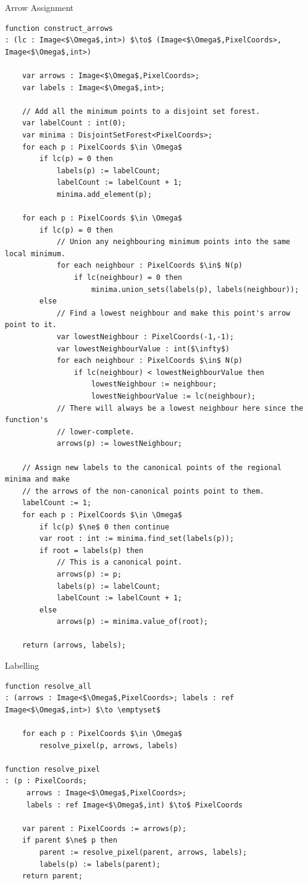 \begin{stulisting}[p]
\caption{Arrow Assignment}
\label{code:segmentation-watershed-arrowassignment}
\begin{lstlisting}[style=Default]
function construct_arrows
: (lc : Image<$\Omega$,int>) $\to$ (Image<$\Omega$,PixelCoords>, Image<$\Omega$,int>)

	var arrows : Image<$\Omega$,PixelCoords>;
	var labels : Image<$\Omega$,int>;

	// Add all the minimum points to a disjoint set forest.
	var labelCount : int(0);
	var minima : DisjointSetForest<PixelCoords>;
	for each p : PixelCoords $\in \Omega$
		if lc(p) = 0 then
			labels(p) := labelCount;
			labelCount := labelCount + 1;
			minima.add_element(p);

	for each p : PixelCoords $\in \Omega$
		if lc(p) = 0 then
			// Union any neighbouring minimum points into the same local minimum.
			for each neighbour : PixelCoords $\in$ N(p)
				if lc(neighbour) = 0 then
					minima.union_sets(labels(p), labels(neighbour));
		else
			// Find a lowest neighbour and make this point's arrow point to it.
			var lowestNeighbour : PixelCoords(-1,-1);
			var lowestNeighbourValue : int($\infty$)
			for each neighbour : PixelCoords $\in$ N(p)
				if lc(neighbour) < lowestNeighbourValue then
					lowestNeighbour := neighbour;
					lowestNeighbourValue := lc(neighbour);
			// There will always be a lowest neighbour here since the function's
			// lower-complete.
			arrows(p) := lowestNeighbour;

	// Assign new labels to the canonical points of the regional minima and make
	// the arrows of the non-canonical points point to them.
	labelCount := 1;
	for each p : PixelCoords $\in \Omega$
		if lc(p) $\ne$ 0 then continue
		var root : int := minima.find_set(labels(p));
		if root = labels(p) then
			// This is a canonical point.
			arrows(p) := p;
			labels(p) := labelCount;
			labelCount := labelCount + 1;
		else
			arrows(p) := minima.value_of(root);

	return (arrows, labels);
\end{lstlisting}
\end{stulisting}

\begin{stulisting}[p]
\caption{Labelling}
\label{code:segmentation-watershed-labelling}
\begin{lstlisting}[style=Default]
function resolve_all
: (arrows : Image<$\Omega$,PixelCoords>; labels : ref Image<$\Omega$,int>) $\to \emptyset$

	for each p : PixelCoords $\in \Omega$
		resolve_pixel(p, arrows, labels)

function resolve_pixel
: (p : PixelCoords;
	 arrows : Image<$\Omega$,PixelCoords>;
	 labels : ref Image<$\Omega$,int) $\to$ PixelCoords

	var parent : PixelCoords := arrows(p);
	if parent $\ne$ p then
		parent := resolve_pixel(parent, arrows, labels);
		labels(p) := labels(parent);
	return parent;
\end{lstlisting}
\end{stulisting}

